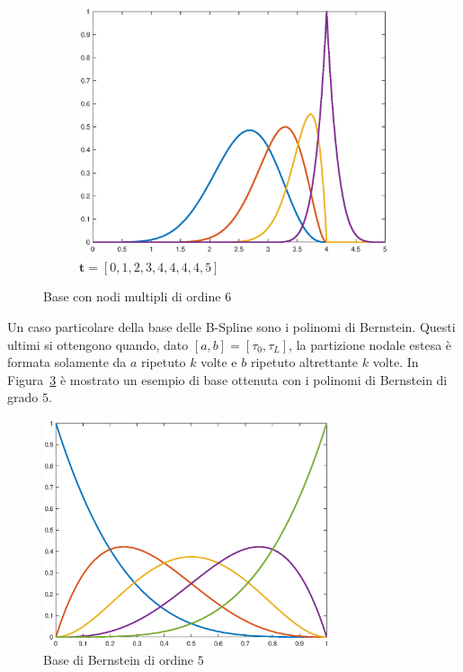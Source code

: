 \documentclass[a4paper, 10pt]{article}
\begin{document}
\begin{figure}[]
\begin{subfigure}[b]{0.3\textwidth}
  \end{subfigure}
  \begin{subfigure}[b]{0.3\textwidth}
    \includegraphics[width=\textwidth]{figure/6_45.eps}
    \caption{$\mathbf{t} = [0, 1, 2, 3, 4, 4, 4, 4, 5]$}
    \label{fig:645}
  \end{subfigure}
  \caption{Base con nodi multipli di ordine 6}\label{fig:animals}
\end{figure}

Un caso particolare della base delle B-Spline sono i polinomi di Bernstein. Questi ultimi si ottengono quando, 
dato $[a, b] = [\tau_0, \tau_L]$, la partizione nodale estesa è formata solamente da $a$ ripetuto $k$ volte
e $b$ ripetuto altrettante $k$ volte. In Figura~\ref{fig:bernstein} è mostrato un esempio di base ottenuta con 
i polinomi di Bernstein di grado $5$.

\begin{figure}[]
  \centering
  \includegraphics[width=0.75\textwidth]{figure/bernstein5_from_cox_de_boor.eps}
  \caption{Base di Bernstein di ordine $5$}
  \label{fig:bernstein}
\end{figure} 
\end{document}
